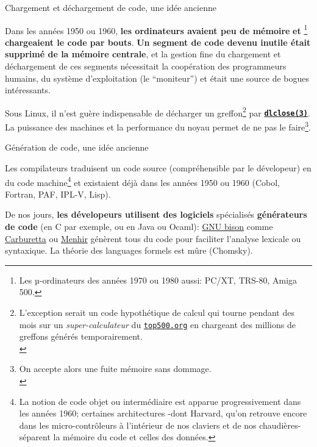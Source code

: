 \documentclass[final,a4]{beamer}
\begin{document}
 \begin{frame}{Chargement et déchargement de code, une idée ancienne}

   Dans les années 1950 ou 1960, \textbf{les ordinateurs avaient peu
     de mémoire} {} \textbf{et} {}\footnote{Les µ-ordinateurs des
   années 1970 ou 1980 aussi: PC/XT, TRS-80, Amiga 500.}
   \textbf{chargeaient le code par bouts}. \textbf{Un segment de code
     devenu inutile était supprimé de la mémoire centrale}, et la
   gestion fine du chargement et déchargement de ces segments
   nécessitait la coopération des programmeurs humains, du système
   d'exploitation (le ``moniteur'') et était une source de bogues
   intéressants.

   \bigskip

   Sous Linux, il n'est guère indispensable de décharger un
   greffon\footnote{L'exception serait un code hypothétique de calcul
   qui tourne pendant des mois sur un \textit{super-calculateur} du
   \href{https://top500.org/}{\texttt{top500.org}} en chargeant des
   millions de greffons générés temporairement.\\} par
   \textbf{\texttt{\href{https://man7.org/linux/man-pages/man3/dlclose.3.html}{dlclose(3)}}}. La
   puissance des machines et la performance du noyau
   {}
   permet de ne pas le faire\footnote{On accepte alors une fuite
   mémoire sans dommage.\\}.

 \end{frame}

 \begin{frame}{Génération de code, une idée ancienne}

  Les compilateurs traduisent un code source (compréhensible par le
  dévelopeur) en du code machine\footnote{La notion de code objet ou
  intermédiaire est apparue progressivement dans les années 1960;
  certaines architectures -dont Harvard, qu'on retrouve encore dans
  les micro-contrôleurs à l'intérieur de nos claviers et de nos
  chaudières- séparent la mémoire du code et celles des données.} et
  existaient déjà dans les années 1950 ou 1960 (Cobol, Fortran, PAF,
  IPL-V, Lisp).

  \bigskip

  De nos jours, \textbf{les dévelopeurs utilisent des logiciels}
  spécialisés \textbf{générateurs de code} (en C par exemple, ou en
  Java ou Ocaml): \href{https://www.gnu.org/software/bison/}{GNU
    bison} comme \href{https://carburetta.com/}{Carburetta} ou
  \href{https://gallium.inria.fr/~fpottier/menhir/}{Menhir} génèrent
  tous du code pour faciliter l'analyse lexicale ou syntaxique. La
  théorie des languages formels est mûre (Chomsky).
 \end{frame}
\end{document}
